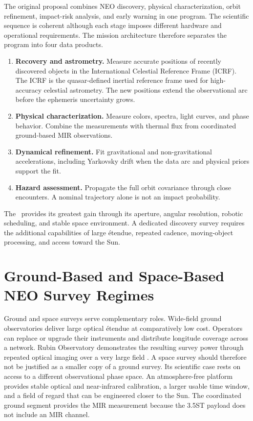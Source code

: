 The original proposal combines NEO discovery, physical characterization,
orbit refinement, impact-risk analysis, and early warning in one program.
The scientific sequence is coherent although each stage imposes different
hardware and operational requirements. The mission architecture therefore
separates the program into four data products.

\begin{enumerate}[leftmargin=7mm,itemsep=2mm]
\item \textbf{\color{cTeal}Recovery and astrometry.} Measure accurate
positions of recently discovered objects in the International Celestial
Reference Frame (ICRF). The ICRF is the quasar-defined inertial reference
frame used for high-accuracy celestial astrometry. The new positions extend
the observational arc before the ephemeris uncertainty grows.
\item \textbf{\color{cGold}Physical characterization.} Measure colors,
spectra, light curves, and phase behavior. Combine the measurements with
thermal flux from coordinated ground-based MIR observations.
\item \textbf{\color{cOrange}Dynamical refinement.} Fit gravitational and
non-gravitational accelerations, including Yarkovsky drift when the data arc
and physical priors support the fit.
\item \textbf{\color{cRed}Hazard assessment.} Propagate the full orbit
covariance through close encounters. A nominal trajectory alone is not an
impact probability.
\end{enumerate}

The \facility\ provides its greatest gain through its aperture, angular
resolution, robotic scheduling, and stable space environment. A dedicated
discovery survey requires the additional capabilities of large étendue,
repeated cadence, moving-object processing, and access toward the Sun.

\section{Ground-Based and Space-Based NEO Survey Regimes}
\label{sec:ground-space-surveys}

Ground and space surveys serve complementary roles. Wide-field ground
observatories deliver large optical étendue at comparatively low cost.
Operators can replace or upgrade their instruments and distribute longitude
coverage across a network. Rubin Observatory demonstrates the resulting
survey power through repeated optical imaging over a very large field
\cite{Ivezic2019}. A space survey should therefore not be justified as a
smaller copy of a ground survey. Its scientific case rests on access to a
different observational phase space. An atmosphere-free platform provides
stable optical and near-infrared calibration, a larger usable time window,
and a field of regard that can be engineered closer to the Sun. The
coordinated ground segment provides the MIR measurement because the 3.5ST
payload does not include an MIR channel.


